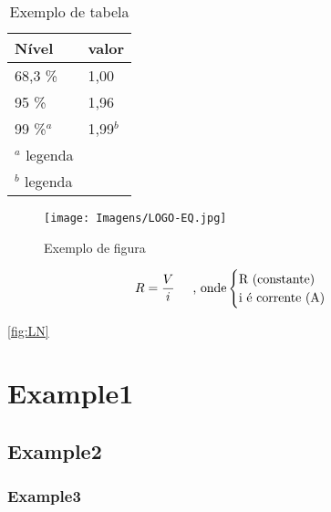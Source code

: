 

\begin{table}[H]
	\centering
	\caption{Exemplo de tabela}
	\label{tab:nivelz}
	\begin{tabular}{l l}
		\hline
		Nível & valor \\ 
		\hline
		68,3 \%      &   1,00\\
		95 \%        &   1,96\\
		99 \%$^a$    &   1,99$^b$\\
		\hline
		\footnotesize{$^a$ legenda} \\
		\footnotesize{$^b$ legenda}\\
	\end{tabular}
\end{table}



\begin{figure}[H]
    \centering
    \caption {Exemplo de figura}
    \texttt{[image: Imagens/LOGO-EQ.jpg]}
    \label{fig:logo}
\end{figure}


\begin{equation}
     R = \frac{V}{i} 
     \textrm{\hspace{0.5cm}, onde}
    \begin{cases}
        \text{R (constante)} \\
        \text{i é corrente (A)}
    \end{cases}
    \label{eq:leiohm}   
\end{equation}






\ref{fig:LN}



\cite{Cataluna2012}



\section{Example1}
\subsection{Example2}
\subsubsection{Example3}


